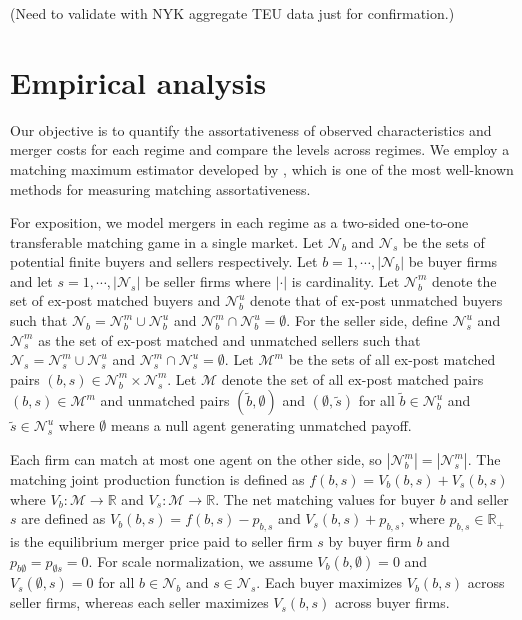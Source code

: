 \documentclass[10pt]{article}
\begin{document}
(Need to validate with NYK aggregate TEU data just for confirmation.)

\section{Empirical analysis}\label{sec:empirical_analysis}

Our objective is to quantify the assortativeness of observed characteristics and merger costs for each regime and compare the levels across regimes. We employ a matching maximum estimator developed by \cite{fox2018estimating}, which is one of the most well-known methods for measuring matching assortativeness.

For exposition, we model mergers in each regime as a two-sided one-to-one transferable matching game in a single market. Let $\mathcal{N}_b$ and $\mathcal{N}_s$ be the sets of potential finite buyers and sellers respectively. Let $b=1,\cdots,|\mathcal{N}_b|$ be buyer firms and let $s=1,\cdots,|\mathcal{N}_s|$ be seller firms where $|\cdot|$ is cardinality. Let $\mathcal{N}_{b}^{m}$ denote the set of ex-post matched buyers and $\mathcal{N}_{b}^{u}$ denote that of ex-post unmatched buyers such that $\mathcal{N}_b= \mathcal{N}_{b}^{m}\cup\mathcal{N}_{b}^{u}$ and $\mathcal{N}_{b}^{m}\cap\mathcal{N}_{b}^{u}=\emptyset$. For the seller side, define $\mathcal{N}_{s}^{u}$ and $\mathcal{N}_{s}^{m}$ as the set of ex-post matched and unmatched sellers such that $\mathcal{N}_s= \mathcal{N}_{s}^{m}\cup\mathcal{N}_{s}^{u}$ and $\mathcal{N}_{s}^{m}\cap\mathcal{N}_{s}^{u}=\emptyset$. Let $\mathcal{M}^m$ be the sets of all ex-post matched pairs $(b,s)\in\mathcal{N}_{b}^{m}\times \mathcal{N}_{s}^{m}$. Let $\mathcal{M}$ denote the set of all ex-post matched pairs $(b,s)\in\mathcal{M}^{m}$ and unmatched pairs $(\tilde{b},\emptyset)$ and $(\emptyset,\tilde{s})$ for all $\tilde{b}\in \mathcal{N}_b^u$ and $\tilde{s}\in \mathcal{N}_s^u$ where $\emptyset$ means a null agent generating unmatched payoff. 

Each firm can match at most one agent on the other side, so  $|\mathcal{N}_b^{m}|=|\mathcal{N}_s^{m}|$. The matching joint production function is defined as $f(b,s)=V_b(b,s)+V_s(b,s)$ where $V_b:\mathcal{M}\rightarrow \mathbb{R}$ and $V_s:\mathcal{M}\rightarrow \mathbb{R}$. The net matching values for buyer $b$ and seller $s$ are defined as $V_b(b,s)=f(b,s)-p_{b,s}$ and $V_s(b,s)+p_{b,s}$, where $p_{b,s}\in \mathbb{R}_{+}$ is the equilibrium merger price paid to seller firm $s$ by buyer firm $b$ and $p_{b\emptyset}=p_{\emptyset s}=0$. For scale normalization, we assume $V_b(b,\emptyset)=0$ and $V_s(\emptyset,s)=0$ for all $b\in \mathcal{N}_b$ and $s\in \mathcal{N}_s$. Each buyer maximizes $V_b(b,s)$ across seller firms, whereas each seller maximizes $V_s(b,s)$ across buyer firms. 
\end{document}
